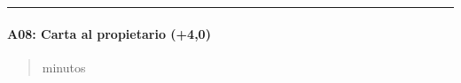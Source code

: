 \documentclass[letterpaper,10pt,spanish]{sphinxmanual}
\begin{document}
\bigskip\hrule\bigskip



\paragraph{A08: Carta al propietario (+4,0)}
\label{\detokenize{cursos/ofimatica10/periodo01/G02:a08-carta-al-propietario-4-0}}
\sphinxAtStartPar
{}
\begin{quote}\begin{description}
 minutos

\end{description}\end{quote}
\end{document}
